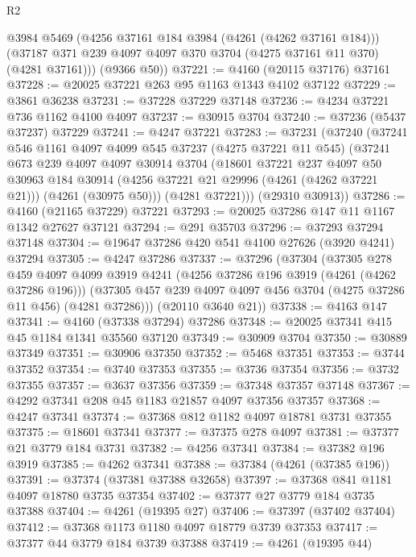 \begin{lexlean}{R2}
\begin{coremodule}
        @3984
        @5469
        (@4256 @37161 @184 @3984 (@4261 (@4262 @37161 @184)))
        (@37187 @371 @239 @4097 @4097 @370 @3704 (@4275 @37161 @11 @370) (@4281 @37161)))
      (@9366 @50))
@37221 := @4160 (@20115 @37176) @37161
@37228 := @20025 @37221 @263 @95 @1163 @1343 @4102 @37122
@37229 := @3861 @36238
@37231 := @37228 @37229 @37148
@37236 := @4234 @37221 @736 @1162 @4100 @4097
@37237 := @30915 @3704
@37240 := @37236 (@5437 @37237) @37229
@37241 := @4247 @37221
@37283 := @37231
    (@37240
      (@37241
        @546
        @1161
        @4097
        @4099
        @545
        @37237
        (@4275 @37221 @11 @545)
        (@37241
          @673
          @239
          @4097
          @4097
          @30914
          @3704
          (@18601
            @37221
            @237
            @4097
            @50
            @30963
            @184
            @30914
            (@4256 @37221 @21 @29996 (@4261 (@4262 @37221 @21)))
            (@4261 (@30975 @50)))
          (@4281 @37221)))
      (@29310 @30913))
@37286 := @4160 (@21165 @37229) @37221
@37293 := @20025 @37286 @147 @11 @1167 @1342 @27627 @37121
@37294 := @291 @35703
@37296 := @37293 @37294 @37148
@37304 := @19647 @37286 @420 @541 @4100 @27626 (@3920 @4241) @37294
@37305 := @4247 @37286
@37337 := @37296
    (@37304
      (@37305
        @278
        @459
        @4097
        @4099
        @3919
        @4241
        (@4256 @37286 @196 @3919 (@4261 (@4262 @37286 @196)))
        (@37305 @457 @239 @4097 @4097 @456 @3704 (@4275 @37286 @11 @456) (@4281 @37286)))
      (@20110 @3640 @21))
@37338 := @4163 @147
@37341 := @4160 (@37338 @37294) @37286
@37348 := @20025 @37341 @415 @45 @1184 @1341 @35560 @37120
@37349 := @30909 @3704
@37350 := @30889 @37349
@37351 := @30906 @37350
@37352 := @5468 @37351
@37353 := @3744 @37352
@37354 := @3740 @37353
@37355 := @3736 @37354
@37356 := @3732 @37355
@37357 := @3637 @37356
@37359 := @37348 @37357 @37148
@37367 := @4292 @37341 @208 @45 @1183 @21857 @4097 @37356 @37357
@37368 := @4247 @37341
@37374 := @37368 @812 @1182 @4097 @18781 @3731 @37355
@37375 := @18601 @37341
@37377 := @37375 @278 @4097
@37381 := @37377 @21 @3779 @184 @3731
@37382 := @4256 @37341
@37384 := @37382 @196 @3919
@37385 := @4262 @37341
@37388 := @37384 (@4261 (@37385 @196))
@37391 := @37374 (@37381 @37388 @32658)
@37397 := @37368 @841 @1181 @4097 @18780 @3735 @37354
@37402 := @37377 @27 @3779 @184 @3735 @37388
@37404 := @4261 (@19395 @27)
@37406 := @37397 (@37402 @37404)
@37412 := @37368 @1173 @1180 @4097 @18779 @3739 @37353
@37417 := @37377 @44 @3779 @184 @3739 @37388
@37419 := @4261 (@19395 @44)

\end{coremodule}
\end{lexlean}
